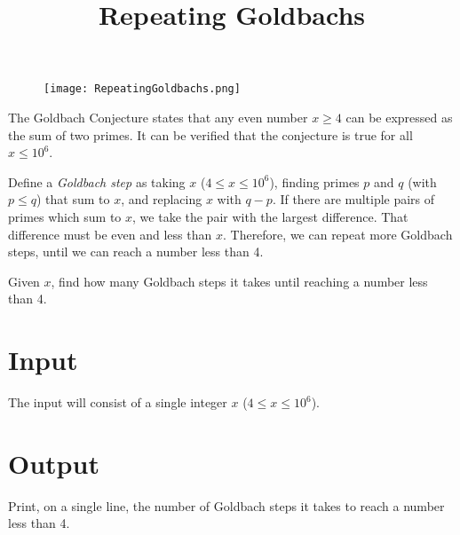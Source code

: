 \documentclass{article}
\title{Repeating Goldbachs}
\date{}
\begin{document}
\maketitle
\begin{figure}[h!]
\centering
\texttt{[image: RepeatingGoldbachs.png]}
\end{figure}


The Goldbach Conjecture states that any even number $x \ge 4$ can be
expressed as the sum of two primes. It can be verified that the
conjecture is true for all $x \le 10^6$.

Define a \emph{Goldbach step} as taking $x$ ($4 \le x \le 10^6$),
finding primes $p$ and $q$ (with $p \le q$) that sum to $x$,
and replacing $x$ with $q-p$.
If there are multiple pairs of primes which sum to $x$, we take
the pair with the largest difference.
That difference must be even and less than $x$.
Therefore, we can repeat more Goldbach steps, until we can reach
a number less than 4.

Given $x$, find how many Goldbach steps it takes until reaching
a number less than 4.

\section{Input}

The input will consist of a single integer $x$ ($4 \le x \le 10^6$).

\section{Output}

Print, on a single line, the number of Goldbach steps it takes to
reach a number less than 4.

\end{document}
